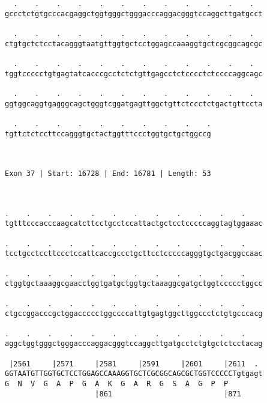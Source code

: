 \documentclass{article}
\begin{document}
\begin{Verbatim}
  .    .    .    .    .    .    .    .    .    .    .    .  
gccctctgtgcccacgaggctggtgggctgggacccaggacgggtccaggcttgatgcct
                                                            
  .    .    .    .    .    .    .    .    .    .    .    .  
ctgtgctctcctacagggtaatgttggtgctcctggagccaaaggtgctcgcggcagcgc
                                                            
  .    .    .    .    .    .    .    .    .    .    .    .  
tggtccccctgtgagtatcacccgcctctctgttgagcctctcccctctccccaggcagc
                                                            
  .    .    .    .    .    .    .    .    .    .    .    .  
ggtggcaggtgagggcagctgggtcggatgagttggctgttctccctctgactgttccta
                                                            
  .    .    .    .    .    .    .    .    .    .
tgttctctccttccagggtgctactggtttccctggtgctgctggccg
                                                
                                                
 
Exon 37 | Start: 16728 | End: 16781 | Length: 53



.    .    .    .    .    .    .    .    .    .    .    .    
tgtttcccacccaagcatcttcctgcctccattactgctcctcccccaggtagtggaaac
                                                            
.    .    .    .    .    .    .    .    .    .    .    .    
tcctgcctccttccctccattcaccgccctgcttcctcccccagggtgctgacggccaac
                                                            
.    .    .    .    .    .    .    .    .    .    .    .    
ctggtgctaaaggcgaacctggtgatgctggtgctaaaggcgatgctggtccccctggcc
                                                            
.    .    .    .    .    .    .    .    .    .    .    .    
ctgccggacccgctggaccccctggccccattgtgagtggcttggccctctgtgcccacg
                                                            
.    .    .    .    .    .    .    .    .    .    .    .    
aggctggtgggctgggacccaggacgggtccaggcttgatgcctctgtgctctcctacag
                                                            
 |2561     |2571     |2581     |2591     |2601     |2611  . 
GGTAATGTTGGTGCTCCTGGAGCCAAAGGTGCTCGCGGCAGCGCTGGTCCCCCTgtgagt
G  N  V  G  A  P  G  A  K  G  A  R  G  S  A  G  P  P        
                     |861                          |871     
  

\end{Verbatim}
\end{document}
